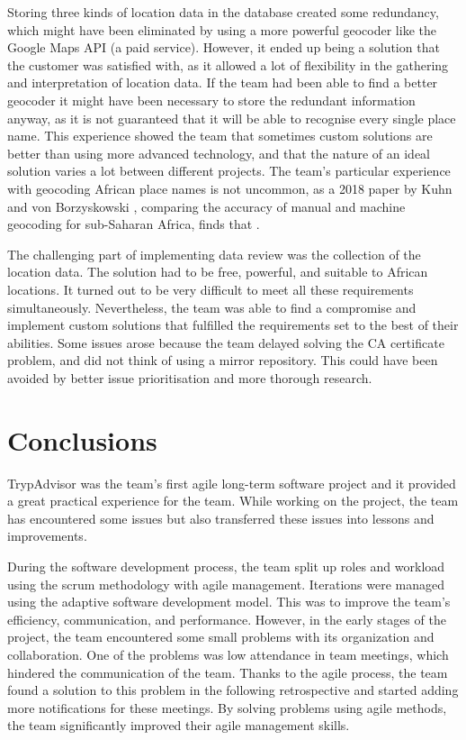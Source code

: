 \documentclass{l3proj}
\begin{document}
Storing three kinds of location data in the database created some redundancy, which might have been eliminated by using a more powerful geocoder like the Google Maps API (a paid service). However, it ended up being a solution that the customer was satisfied with, as it allowed a lot of flexibility in the gathering and interpretation of location data. If the team had been able to find a better geocoder it might have been necessary to store the redundant information anyway, as it is not guaranteed that it will be able to recognise every single place name.
This experience showed the team that sometimes custom solutions are better than using more advanced technology, and that the nature of an ideal solution varies a lot between different projects.
The team's particular experience with geocoding African place names is not uncommon, as a 2018 paper by Kuhn and von Borzyskowski \cite{africaGeocode}, comparing the accuracy of manual and machine geocoding for sub-Saharan Africa, finds that .

The challenging part of implementing data review was the collection of the location data. The solution had to be free, powerful, and suitable to African locations. It turned out to be very difficult to meet all these requirements simultaneously. Nevertheless, the team was able to find a compromise and implement custom solutions that fulfilled the requirements set to the best of their abilities. Some issues arose because the team delayed solving the CA certificate problem, and did not think of using a mirror repository. This could have been avoided by better issue prioritisation and more thorough research.

\section{Conclusions}
\label{sec:conclusion}

TrypAdvisor was the team's first agile long-term software project and it provided a great practical experience for the team. While working on the project, the team has encountered some issues but also transferred these issues into lessons and improvements.

During the software development process, the team split up roles and workload using the scrum methodology with agile management. Iterations were managed using the adaptive software development model. This was to improve the team's efficiency, communication, and performance. However, in the early stages of the project, the team encountered some small problems with its organization and collaboration. One of the problems was low attendance in team meetings, which hindered the communication of the team. Thanks to the agile process, the team found a solution to this problem in the following retrospective and started adding more notifications for these meetings. By solving problems using agile methods, the team significantly improved their agile management skills.
\end{document}
